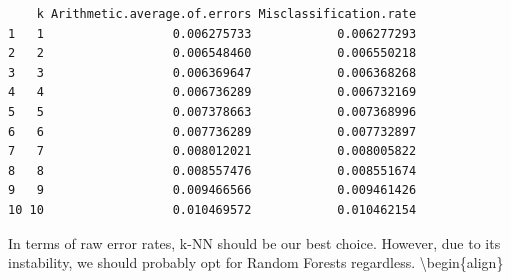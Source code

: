 \documentclass[
  letterpaper,
  DIV=11,
  numbers=noendperiod]{scrartcl}
\begin{document}
\begin{verbatim}
    k Arithmetic.average.of.errors Misclassification.rate
1   1                  0.006275733            0.006277293
2   2                  0.006548460            0.006550218
3   3                  0.006369647            0.006368268
4   4                  0.006736289            0.006732169
5   5                  0.007378663            0.007368996
6   6                  0.007736289            0.007732897
7   7                  0.008012021            0.008005822
8   8                  0.008557476            0.008551674
9   9                  0.009466566            0.009461426
10 10                  0.010469572            0.010462154
\end{verbatim}

In terms of raw error rates, k-NN should be our best choice. However,
due to its instability, we should probably opt for Random Forests
regardless. \textbackslash begin\{align\}
\end{document}
